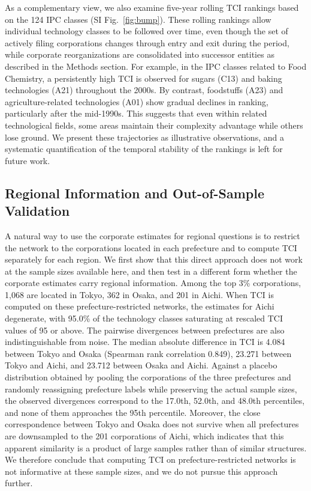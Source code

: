 \documentclass[lineno,pdflatex,sn-mathphys-num]{sn-jnl}%
\theoremstyle{thmstyleone}%
\theoremstyle{thmstyletwo}%
\theoremstyle{thmstylethree}%
\begin{document}
As a complementary view, we also examine five-year rolling TCI rankings based on the 124 IPC classes (SI Fig.~\ref{fig:bump}).
These rolling rankings allow individual technology classes to be followed over time, even though the set of actively filing corporations changes through entry and exit during the period, while corporate reorganizations are consolidated into successor entities as described in the Methods section.
For example, in the IPC classes related to Food Chemistry, a persistently high TCI is observed for sugars (C13) and baking technologies (A21) throughout the 2000s.
By contrast, foodstuffs (A23) and agriculture-related technologies (A01) show gradual declines in ranking, particularly after the mid-1990s.
This suggests that even within related technological fields, some areas maintain their complexity advantage while others lose ground.
We present these trajectories as illustrative observations, and a systematic quantification of the temporal stability of the rankings is left for future work.

\subsection{Regional Information and Out-of-Sample Validation}\label{subsection:validation}

A natural way to use the corporate estimates for regional questions is to restrict the network to the corporations located in each prefecture and to compute TCI separately for each region.
We first show that this direct approach does not work at the sample sizes available here, and then test in a different form whether the corporate estimates carry regional information.
Among the top 3\% corporations, 1,068 are located in Tokyo, 362 in Osaka, and 201 in Aichi.
When TCI is computed on these prefecture-restricted networks, the estimates for Aichi degenerate, with 95.0\% of the technology classes saturating at rescaled TCI values of 95 or above.
The pairwise divergences between prefectures are also indistinguishable from noise.
The median absolute difference in TCI is 4.084 between Tokyo and Osaka (Spearman rank correlation 0.849), 23.271 between Tokyo and Aichi, and 23.712 between Osaka and Aichi.
Against a placebo distribution obtained by pooling the corporations of the three prefectures and randomly reassigning prefecture labels while preserving the actual sample sizes, the observed divergences correspond to the 17.0th, 52.0th, and 48.0th percentiles, and none of them approaches the 95th percentile.
Moreover, the close correspondence between Tokyo and Osaka does not survive when all prefectures are downsampled to the 201 corporations of Aichi, which indicates that this apparent similarity is a product of large samples rather than of similar structures.
We therefore conclude that computing TCI on prefecture-restricted networks is not informative at these sample sizes, and we do not pursue this approach further.
\end{document}
